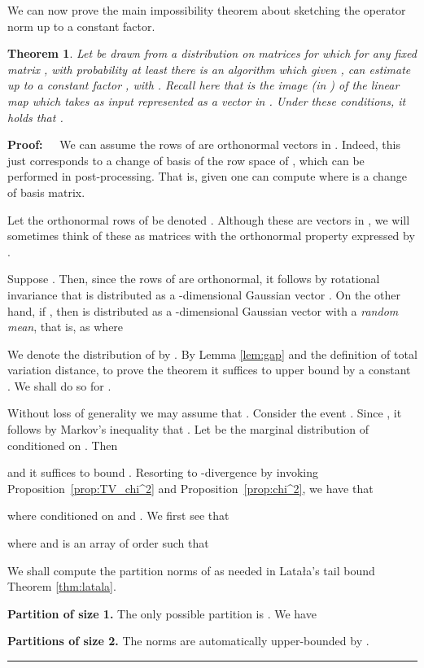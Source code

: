 \documentclass[11pt]{article}
\newtheorem{theorem}{Theorem}
\newenvironment{proof}{\begin{trivlist} \item {\bf Proof:~~}}
  {\qed\end{trivlist}}
\def\qed{\hfill\rule{2mm}{2mm}}
\begin{document}
We can now prove the main impossibility theorem about sketching the operator norm up to a constant factor. 
\begin{theorem}\cite{r14}
Let  be drawn from a distribution on matrices for which for any fixed 
matrix , with probability at least  
there is an algorithm which given , can estimate  up to a constant factor , 
with . Recall here that  is the image (in ) of the linear map  which
takes as input  represented as a vector in .
Under these conditions, it holds that . 
\end{theorem}
\begin{proof}
We can assume the rows of  are orthonormal vectors in . Indeed, this just corresponds to a change
of basis of the row space of , which can be performed in post-processing. That is, given  one
can compute  where  is a  change of basis matrix.

Let the orthonormal rows of
 be denoted . Although these are vectors in , we will sometimes think
of these as  matrices with the orthonormal property expressed by . 

Suppose . Then, since the rows of  are orthonormal, it follows by rotational invariance 
that  is distributed as a -dimensional Gaussian vector . 
On the other hand, if , then 
 is distributed as a -dimensional Gaussian vector with a {\it random mean}, that is, as
 where

We denote the distribution of  by . 
By Lemma \ref{lem:gap} and the definition of total variation distance, 
to prove the theorem it suffices to upper bound  by a constant . We shall
do so for . 

Without loss of generality we may assume that . 
Consider the event . 
Since , it follows by Markov's inequality that 
. 
Let  be the marginal distribution of  conditioned on . Then

and it suffices to bound . 
Resorting to -divergence by invoking Proposition~\ref{prop:TV_chi^2} and Proposition~\ref{prop:chi^2}, we have that

where  conditioned on  and . We first see that 

where  and  is an array of order  such that

We shall compute the partition norms of  as needed in Lata{\l}a's tail bound Theorem \ref{thm:latala}. 

\noindent\textbf{Partition of size 1.}
The only possible partition is . We have


\noindent\textbf{Partitions of size 2.} The norms are automatically upper-bounded by .


\end{proof}
\end{document}
